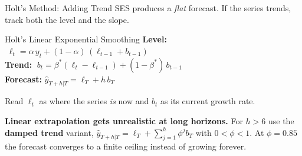 \documentclass[aspectratio=169, 11pt]{beamer}
\begin{document}
\begin{frame}{Holt's Method: Adding Trend}
  SES produces a \emph{flat} forecast. If the series trends, track both the
  level and the slope.
  \begin{definitionbox}{Holt's Linear Exponential Smoothing \parencite{Holt2004}}
    {\small
    \textbf{Level:} $\;\ell_t = \alpha\, y_t + (1-\alpha)\,(\ell_{t-1} + b_{t-1})$\\[2pt]
    \textbf{Trend:} $\;b_t = \beta^*(\ell_t - \ell_{t-1}) + (1-\beta^*)\,b_{t-1}$\\[2pt]
    \textbf{Forecast:} $\hat{y}_{T+h|T} = \ell_T + h\,b_T$
    }
  \end{definitionbox}
  Read $\ell_t$ as where the series \emph{is} now and $b_t$ as its current
  growth rate.

  \vspace{0.1cm}
  \textbf{Linear extrapolation gets unrealistic at long horizons.} For $h > 6$
  use the \textbf{damped trend} variant,
  $\hat{y}_{T+h|T} = \ell_T + \sum_{j=1}^{h}\phi^j b_T$ with $0 < \phi < 1$.
  At $\phi = 0.85$ the forecast converges to a finite ceiling instead of
  growing forever.
\end{frame}
\end{document}
